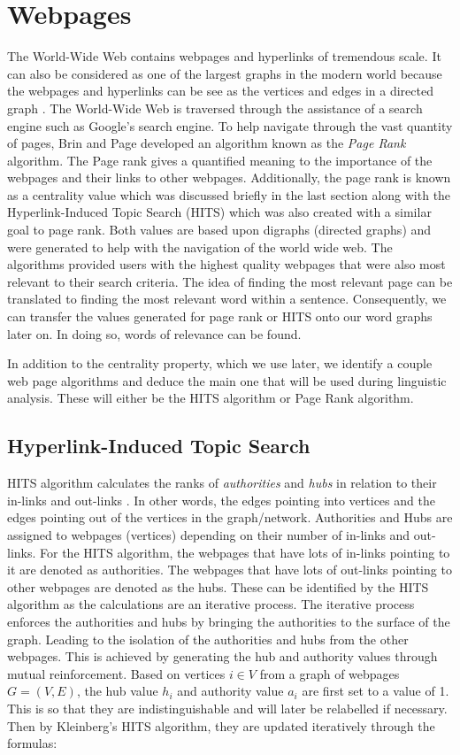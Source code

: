 \section{Webpages}
The World-Wide Web contains webpages and hyperlinks of tremendous scale. It can also be considered as one of the largest graphs in the modern world because the webpages and hyperlinks can be see as the vertices and edges in a directed graph \cite{kumar2000web}. The World-Wide Web is traversed through the assistance of a search engine such as Google's search engine. To help navigate through the vast quantity of pages, Brin and Page \cite{brin1998anatomy} developed an algorithm known as the \emph{Page Rank} algorithm. The Page rank gives a quantified meaning to the importance of the webpages and their links to other webpages. Additionally, the page rank is known as a centrality value which was discussed briefly in the last section along with the Hyperlink-Induced Topic Search (HITS) which was also created with a similar goal to page rank. Both values are based upon digraphs (directed graphs) and were generated to help with the navigation of the world wide web. The algorithms provided users with the highest quality webpages that were also most relevant to their search criteria. The idea of finding the most relevant page can be translated to finding the most relevant word within a sentence. Consequently, we can transfer the values generated for page rank or HITS onto our word graphs later on. In doing so, words of relevance can be found.

In addition to the centrality property, which we use later, we identify a couple web page algorithms and deduce the main one that will be used during linguistic analysis. These will either be the HITS algorithm or Page Rank algorithm.

\subsection{Hyperlink-Induced Topic Search}
HITS algorithm calculates the ranks of \emph{authorities} and \emph{hubs} in relation to their in-links and out-links \cite{langville2005survey}. In other words, the edges pointing into vertices and the edges pointing out of the vertices in the graph/network. Authorities and Hubs are assigned to webpages (vertices) depending on their number of in-links and out-links. For the HITS algorithm, the webpages that have lots of in-links pointing to it are denoted as authorities. The webpages that have lots of out-links pointing to other webpages are denoted as the hubs. These can be identified by the HITS algorithm as the calculations are an iterative process. The iterative process enforces the authorities and hubs by bringing the authorities to the surface of the graph. Leading to the isolation of the authorities and hubs from the other webpages. This is achieved by generating the hub and authority values through mutual reinforcement. Based on vertices $i \in V$ from a graph of webpages $G = (V , E)$, the hub value $h_i$ and authority value $a_i$ are first set to a value of 1. This is so that they are indistinguishable and will later be relabelled if necessary. Then by Kleinberg's HITS algorithm, they are updated iteratively through the formulas:

